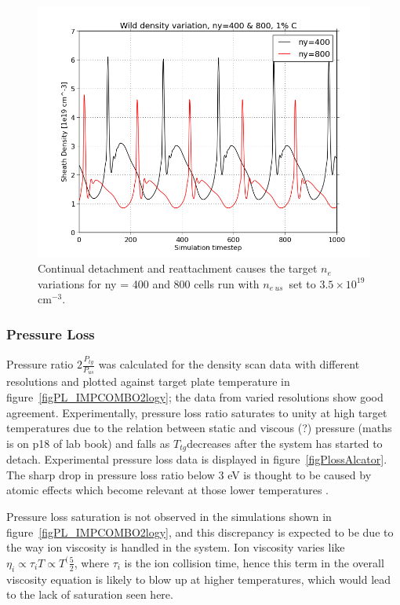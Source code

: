 \documentclass[11pt]{article}  %
\providecommand{\noNe}[1]{{${#1}\times 10^{19}$ cm$^{-3}$}} %
\providecommand{\neus}{$n_{e~us}$} %
\providecommand{\Ttg}{$T_{tg}$} %
\begin{document}
\begin{figure}
\includegraphics[scale=0.5]{Figures/sol1d/ny400800r35netg.png}
\centering
\caption{Continual detachment and reattachment causes the target $n_e$ variations for ny = 400 and 800 cells run with \neus~set to \noNe{3.5}.}\label{figny400800r35netg}
\end{figure}


\subsubsection{Pressure Loss}\label{sssecPloss}
Pressure ratio $2\frac{P_{tg}}{P_{us}}$ was calculated for the density scan data with different resolutions and plotted against target plate temperature in figure~\ref{figPL_IMPCOMBO2logy}; the data from varied resolutions show good agreement. Experimentally, pressure loss ratio saturates to unity at high target temperatures due to the relation between static and viscous (?) pressure (maths is on p18 of lab book) and falls as \Ttg decreases after the system has started to detach. Experimental pressure loss data is displayed in figure~\ref{figPlossAlcator}. The sharp drop in pressure loss ratio below 3 eV is thought to be caused by atomic effects which become relevant at those lower temperatures \cite{Pitcher1997}.

Pressure loss saturation is not observed in the simulations shown in figure~\ref{figPL_IMPCOMBO2logy}, and this discrepancy is expected to be due to the way ion viscosity is handled in the system. Ion viscosity varies like $\eta_i \propto \tau_i T \propto T^(\frac{5}{2}$, where $\tau_i$ is the ion collision time, hence this term in the overall viscosity equation is likely to blow up at higher temperatures, which would lead to the lack of saturation seen here. 
\end{document}
